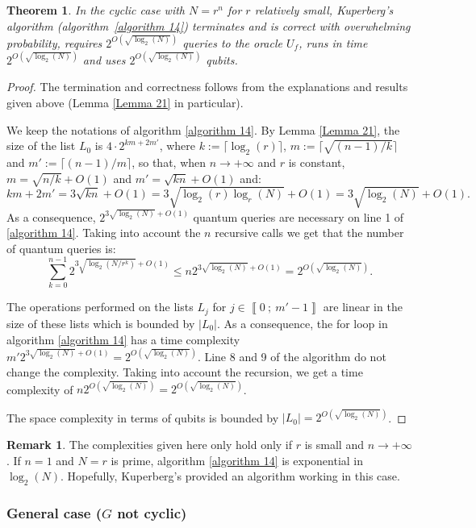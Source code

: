 \documentclass[a4paper,10pt]{report}
\theoremstyle{definition}
\theoremstyle{plain}
\newtheorem{Theorem}[Definition]{Theorem}
\theoremstyle{definition}
\newtheorem{Remark}[Definition]{Remark}
\renewcommand{\i}[2]{\left\llbracket #1~;~#2\right\rrbracket}
\renewcommand{\(}{\left(}
\renewcommand{\)}{\right)}
\begin{document}
\begin{Theorem}
In the cyclic case with $N=r^n$ for $r$ relatively small, Kuperberg's algorithm (algorithm~\ref{algorithm 14}) terminates and is correct with overwhelming probability, requires $2^{O(\sqrt{\log_2(N)})}$ queries to the oracle $U_f$, runs in time $2^{O(\sqrt{\log_2(N)})}$ and uses $2^{O(\sqrt{\log_2(N)})}$ qubits.
\end{Theorem}

\begin{proof}
The termination and correctness follows from the explanations and results given above (Lemma \ref{Lemma 21} in particular).

We keep the notations of algorithm \ref{algorithm 14}. By Lemma \ref{Lemma  21}, the size of the list $L_0$ is $4\cdot 2^{km+2m'}$, where $k:=\lceil\log_2(r)\rceil$, $m:=\lceil \sqrt{(n-1)/k}\rceil$ and $m':=\lceil (n-1)/m\rceil$, so that, when $n\rightarrow+\infty$ and $r$ is constant, $m=\sqrt{n/k}+O(1)$ and $m'=\sqrt{kn}+O(1)$ and: 
\[km+2m'=3\sqrt{kn}+O(1)=3\sqrt{\log_2(r)\log_r(N)}+O(1)=3\sqrt{\log_2(N)}+O(1).\]
As a consequence, $2^{3\sqrt{\log_2(N)}+O(1)}$ quantum queries are necessary on line 1 of \ref{algorithm 14}. Taking into account the $n$ recursive calls we get that the number of quantum queries is:
\[\sum_{k=0}^{n-1}2^{3\sqrt{\log_2(N/r^k)}+O(1)}\leq n2^{3\sqrt{\log_2(N)}+O(1)}=2^{O(\sqrt{\log_2(N)})}.\]

The operations performed on the lists $L_j$ for $j\in\i{0}{m'-1}$ are linear in the size of these lists which is bounded by $|L_0|$. As a consequence, the for loop in algorithm \ref{algorithm 14} has a time complexity $m'2^{3\sqrt{\log_2(N)}+O(1)}=2^{O(\sqrt{\log_2(N)})}$. Line 8 and 9 of the algorithm do not change the complexity. Taking into account the recursion, we get a time complexity of $n2^{O(\sqrt{\log_2(N)})}=2^{O(\sqrt{\log_2(N)})}$.

The space complexity in terms of qubits is bounded by $|L_0|=2^{O(\sqrt{\log_2(N)})}$.
\end{proof}

\begin{Remark}
The complexities given here only hold only if $r$ is small and $n\rightarrow +\infty$. If $n=1$ and $N=r$ is prime, algorithm \ref{algorithm 14} is exponential in $\log_2(N)$.  Hopefully, Kuperberg's provided an algorithm working in this case.
\end{Remark}

\subsubsection{General case ($G$ not cyclic)}
\end{document}
